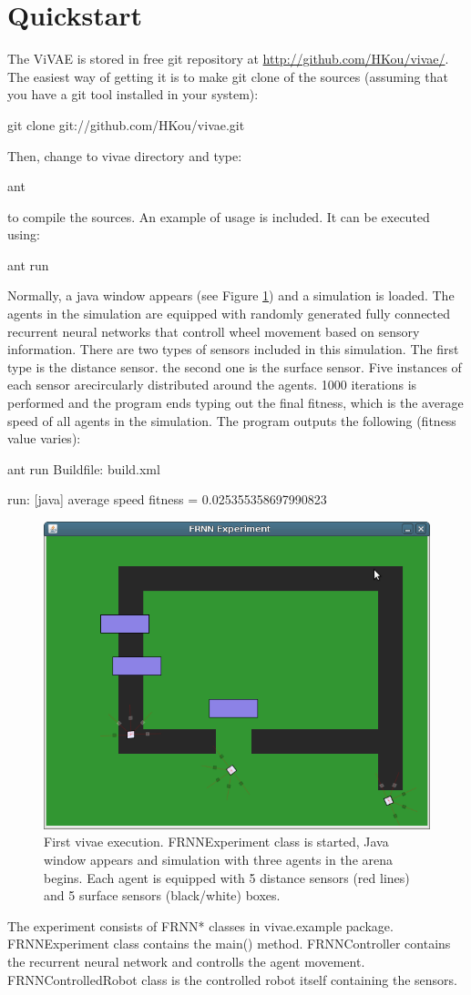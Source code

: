 \section*{Quickstart}

The ViVAE is stored in free git repository at \url{http://github.com/HKou/vivae/}. The easiest way of getting it is to make git clone of the sources (assuming that you have a git tool installed in your system):

\begin{colorverbatim}
git clone git://github.com/HKou/vivae.git 
\end{colorverbatim}

Then, change to vivae directory and type:

\begin{colorverbatim}
ant
\end{colorverbatim}

to compile the sources.
An example of usage is included. It can be executed using:

\begin{colorverbatim}
ant run
\end{colorverbatim}

Normally, a java window appears (see Figure \ref{fig:intro}) and a simulation is loaded. The agents in the simulation are equipped with randomly generated fully connected recurrent neural networks that controll wheel movement based on sensory information. There are two types of sensors included in this simulation. The first type is the distance sensor. the second one is the surface sensor. Five instances of each sensor arecircularly distributed around the agents. 1000 iterations is performed and the program ends typing out the final fitness, which is the average speed of all agents in the simulation. The program outputs the following (fitness value varies):


\begin{colorverbatim}
ant run
Buildfile: build.xml

run:
     [java] average speed fitness = 0.025355358697990823
\end{colorverbatim}

\begin{figure}[h!]
\centering
\includegraphics[width=.6\textwidth]{figures/intro}
\caption{First vivae execution. FRNNExperiment class is started, Java window appears and simulation with three agents in the arena begins. Each agent is equipped with 5 distance sensors (red lines) and 5 surface sensors (black/white) boxes.}
\label{fig:intro}
\end{figure}

The experiment consists of FRNN* classes in vivae.example package. FRNNExperiment class contains the main() method. FRNNController contains the recurrent neural network and controlls the agent movement. FRNNControlledRobot class is the controlled robot itself containing the sensors. 

